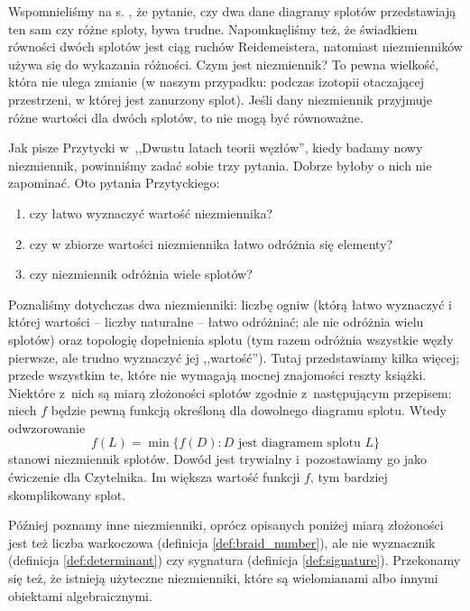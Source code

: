 
Wspomnieliśmy na s. \pageref{page_first_invariant}, że pytanie, czy dwa dane diagramy splotów przedstawiają ten sam czy różne sploty, bywa trudne.
Napomknęliśmy też, że świadkiem równości dwóch splotów jest ciąg ruchów Reidemeistera, natomiast niezmienników używa się do wykazania różności.
Czym jest niezmiennik?
To pewna wielkość, która nie ulega zmianie (w naszym przypadku: podczas izotopii otaczającej przestrzeni, w której jest zanurzony splot).
Jeśli dany niezmiennik przyjmuje różne wartości dla dwóch splotów, to nie mogą być równoważne.

Jak pisze Przytycki w~,,Dwustu latach teorii węzłów'', kiedy badamy nowy niezmiennik, powinniśmy zadać sobie trzy pytania.
%
Dobrze byłoby o nich nie zapominać.
Oto pytania Przytyckiego:
\begin{enumerate}
    \item czy łatwo wyznaczyć wartość niezmiennika?
    \item czy w zbiorze wartości niezmiennika łatwo odróżnia się elementy?
    \item czy niezmiennik odróżnia wiele splotów?
\end{enumerate}

Poznaliśmy dotychczas dwa niezmienniki: liczbę ogniw (którą łatwo wyznaczyć i której wartości -- liczby naturalne -- łatwo odróżniać; ale nie odróżnia wielu splotów) oraz topologię dopełnienia splotu (tym razem odróżnia wszystkie węzły pierwsze, ale trudno wyznaczyć jej ,,wartość'').
Tutaj przedstawiamy kilka więcej; przede wszystkim te, które nie wymagają mocnej znajomości reszty książki.
Niektóre z~nich są miarą złożoności splotów zgodnie z~następującym przepisem: niech $f$ będzie pewną funkcją określoną dla dowolnego diagramu splotu.
Wtedy odwzorowanie
\begin{equation}
    f(L) = \min \{f(D) : D \text{ jest diagramem splotu } L\}
\end{equation}
stanowi niezmiennik splotów.
Dowód jest trywialny i~pozostawiamy go jako ćwiczenie dla Czytelnika.
Im większa wartość funkcji $f$, tym bardziej skomplikowany splot.

Później poznamy inne niezmienniki, oprócz opisanych poniżej miarą złożoności jest też liczba warkoczowa (definicja \ref{def:braid_number}), ale nie wyznacznik (definicja \ref{def:determinant}) czy sygnatura (definicja \ref{def:signature}).
Przekonamy się też, że istnieją użyteczne niezmienniki, które są wielomianami albo innymi obiektami algebraicznymi.

